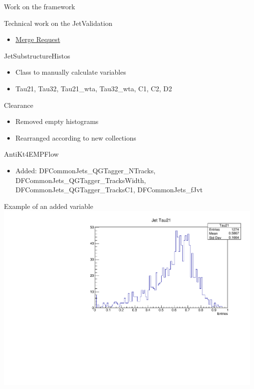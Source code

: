 \begin{frame}
    \centering \Huge Work on the framework
\end{frame}

\begin{frame}{Technical work on the JetValidation}
    \begin{itemize}
        \item \href{https://gitlab.cern.ch/atlas/athena/-/merge_requests/40475}{Merge Request}
    \end{itemize}
    \begin{block}{JetSubstructureHistos}
        \begin{itemize}
            \item Class to manually calculate variables
            \item Tau21, Tau32, Tau21\_wta, Tau32\_wta, C1, C2, D2
        \end{itemize}
    \end{block}
    \begin{block}{Clearance}
        \begin{itemize}
            \item Removed empty histograms
            \item Rearranged according to new collections
        \end{itemize}
    \end{block}
    \begin{block}{AntiKt4EMPFlow}
        \begin{itemize}
            \item Added: DFCommonJets\_QGTagger\_NTracks, DFCommonJets\_QGTagger\_TracksWidth, DFCommonJets\_QGTagger\_TracksC1, DFCommonJets\_fJvt
        \end{itemize}
    \end{block}    
\end{frame}

\begin{frame}{Example of an added variable}
    \centering \includegraphics[width=\textwidth]{Tau21_example}
\end{frame}
